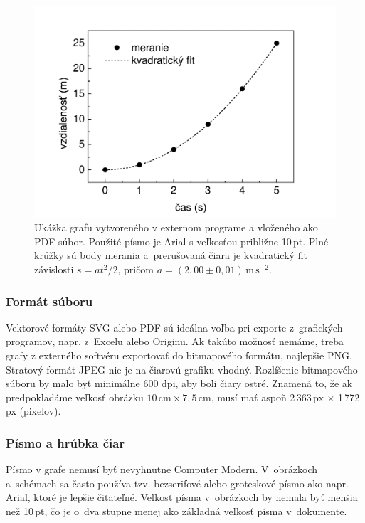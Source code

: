\begin{figure}[h!]
  \centering
  \includegraphics[scale=0.358]{img/Graph1}
  \caption{Ukážka grafu vytvoreného v externom programe a vloženého ako PDF súbor.
  Použité písmo je Arial s veľkosťou približne 10\,pt. Plné krúžky sú body merania a~prerušovaná čiara je kvadratický fit závislosti $s = at^2/2$, pričom $a = (2{,}00 \pm0{,}01)\,\mathrm{m\,s^{-2}}$.}
  \label{fig:Graph1}
\end{figure}

\subsubsection{Formát súboru}
Vektorové formáty SVG alebo PDF sú ideálna voľba pri exporte
z~grafických programov, napr. z~Excelu alebo Originu.
Ak takúto možnosť nemáme, treba grafy z externého softvéru
exportovať do bitmapového formátu, najlepšie PNG.
Stratový formát JPEG nie je na čiarovú grafiku vhodný.
Rozlíšenie bitmapového súboru by malo byť minimálne 600 dpi,
aby boli čiary ostré.
Znamená to, že ak predpokladáme veľkosť obrázku
$10\,\mathrm{cm} \times 7{,}5\,\mathrm{cm}$,
musí mať aspoň 2\,363\,px $\times$ 1\,772\,px (pixelov).

\subsubsection{Písmo a hrúbka čiar}
Písmo v grafe nemusí byť nevyhnutne Computer Modern.
V~obrázkoch a~schémach sa často používa
tzv. bezserifové alebo groteskové písmo ako napr. Arial,
ktoré je lepšie čitateľné.
Veľkosť písma v~obrázkoch by nemala byť menšia než
10\,pt,
čo je o~dva stupne menej ako základná veľkosť písma
v~dokumente.

